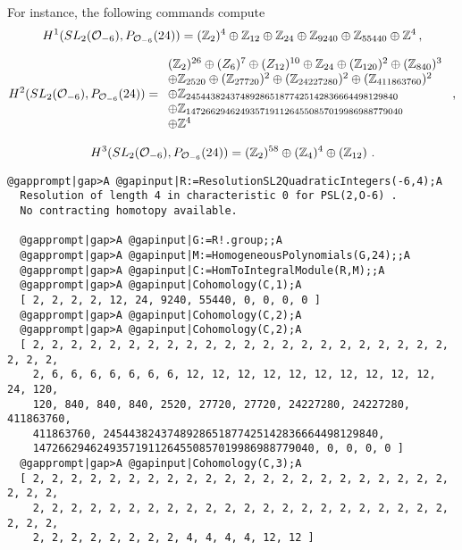 \documentclass[a4paper,11pt]{report}
\begin{document}
{{For instance, the following commands compute 
\[H^1(SL_2({\cal O}_{-6}),P_{{\cal O}_{-6}}(24)) = (\mathbb Z_2)^4 \oplus
\mathbb Z_{12} \oplus \mathbb Z_{24} \oplus \mathbb Z_{9240} \oplus \mathbb
Z_{55440} \oplus \mathbb Z^4\,, \]
 
\[H^2(SL_2({\cal O}_{-6}),P_{{\cal O}_{-6}}(24)) = \begin{array}{l} (\mathbb
Z_2)^{26} \oplus \mathbb (Z_{6})^7 \oplus \mathbb (Z_{12})^{10} \oplus \mathbb
Z_{24} \oplus (\mathbb Z_{120})^2 \oplus (\mathbb Z_{840})^3\\ \oplus \mathbb
Z_{2520} \oplus (\mathbb Z_{27720})^2 \oplus (\mathbb Z_{24227280})^2 \oplus
(\mathbb Z_{411863760})^2\\ \oplus \mathbb
Z_{2454438243748928651877425142836664498129840}\\ \oplus \mathbb
Z_{14726629462493571911264550857019986988779040}\\ \oplus \mathbb
Z^4\end{array}\ , \]
 
\[H^3(SL_2({\cal O}_{-6}),P_{{\cal O}_{-6}}(24)) = (\mathbb Z_2)^{58} \oplus
(\mathbb Z_{4})^4 \oplus (\mathbb Z_{12})\ . \]
 
\begin{Verbatim}[commandchars=@|A,fontsize=\small,frame=single,label=Example]
  @gapprompt|gap>A @gapinput|R:=ResolutionSL2QuadraticIntegers(-6,4);A
  Resolution of length 4 in characteristic 0 for PSL(2,O-6) . 
  No contracting homotopy available. 
  
  @gapprompt|gap>A @gapinput|G:=R!.group;;A
  @gapprompt|gap>A @gapinput|M:=HomogeneousPolynomials(G,24);;A
  @gapprompt|gap>A @gapinput|C:=HomToIntegralModule(R,M);;A
  @gapprompt|gap>A @gapinput|Cohomology(C,1);A
  [ 2, 2, 2, 2, 12, 24, 9240, 55440, 0, 0, 0, 0 ]
  @gapprompt|gap>A @gapinput|Cohomology(C,2);A
  @gapprompt|gap>A @gapinput|Cohomology(C,2);A
  [ 2, 2, 2, 2, 2, 2, 2, 2, 2, 2, 2, 2, 2, 2, 2, 2, 2, 2, 2, 2, 2, 2, 2, 2, 2, 
    2, 6, 6, 6, 6, 6, 6, 6, 12, 12, 12, 12, 12, 12, 12, 12, 12, 12, 24, 120, 
    120, 840, 840, 840, 2520, 27720, 27720, 24227280, 24227280, 411863760, 
    411863760, 2454438243748928651877425142836664498129840, 
    14726629462493571911264550857019986988779040, 0, 0, 0, 0 ]
  @gapprompt|gap>A @gapinput|Cohomology(C,3);A
  [ 2, 2, 2, 2, 2, 2, 2, 2, 2, 2, 2, 2, 2, 2, 2, 2, 2, 2, 2, 2, 2, 2, 2, 2, 2, 
    2, 2, 2, 2, 2, 2, 2, 2, 2, 2, 2, 2, 2, 2, 2, 2, 2, 2, 2, 2, 2, 2, 2, 2, 2, 
    2, 2, 2, 2, 2, 2, 2, 2, 4, 4, 4, 4, 12, 12 ]
  
\end{Verbatim}
 

}}
\end{document}
